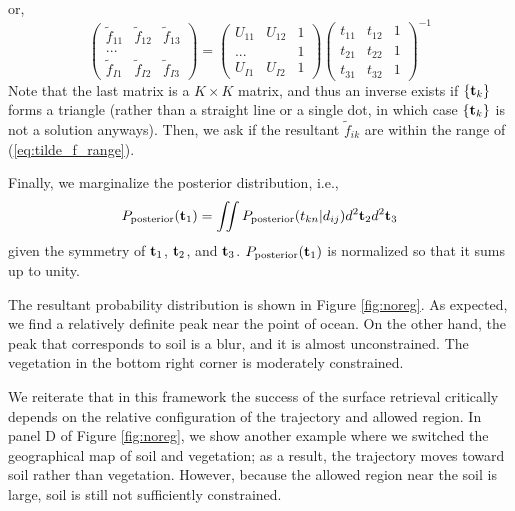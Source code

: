 \documentclass[iop,numberedappendix,apj,]{emulateapj}
\def\fast{\tilde f}
\begin{document}
or,
\begin{equation}
\begin{pmatrix}
\fast_{11} & \fast_{12} & \fast_{13}  \\
... & \\
\fast_{I1} & \fast_{I2} & \fast_{I3}
\end{pmatrix}
=
\begin{pmatrix}
U_{11} & U_{12} & 1 \\
... & & 1 \\
U_{I1} & U_{I2} & 1 
\end{pmatrix}
\begin{pmatrix}
t_{11} & t_{12} & 1 \\
t_{21} & t_{22} & 1 \\
t_{31} & t_{32} & 1 
\end{pmatrix}^{-1}
\label{eq:f=ds-1}
\end{equation}
Note that the last matrix is a $K\times K$ matrix, and thus an inverse exists if $\{ {\bf t}_k \}$ forms a triangle (rather than a straight line or a single dot, in which case $\{ {\bf t}_k \}$ is not a solution anyways).
Then, we ask if the resultant $\fast_{ik}$ are within the range of (\ref{eq:tilde_f_range}). 

Finally, we marginalize the posterior distribution, i.e.,
\begin{equation} 
P_{\rm posterior} ( {\bf t}_1) = \iint P_{\rm posterior} ( t_{kn} | d_{ij} ) d^2 {\bf t}_2 d^2 {\bf t}_3
\end{equation}
given the symmetry of ${\bf t}_1$, ${\bf t}_2$, and ${\bf t}_3$. 
$P_{\rm posterior} ( {\bf t}_1) $ is normalized so that it sums up to unity. 

The resultant probability distribution is shown in Figure \ref{fig:noreg}. 
As expected, we find a relatively definite peak near the point of ocean. 
On the other hand, the peak that corresponds to soil is a blur, and it is almost unconstrained. 
The vegetation in the bottom right corner is moderately constrained. 

We reiterate that in this framework the success of the surface retrieval critically depends on the relative configuration of the trajectory and allowed region. 
In panel D of Figure \ref{fig:noreg}, we show another example where we switched the geographical map of soil and vegetation; as a result, the trajectory moves toward soil rather than vegetation. However, because the allowed region near the soil is large, soil is still not sufficiently constrained. 
\end{document}
